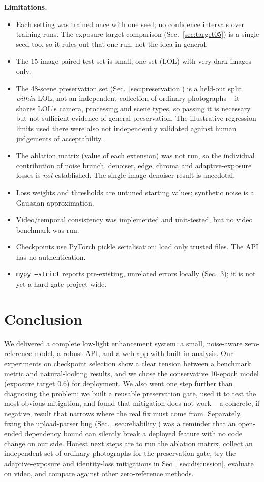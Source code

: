 \documentclass{article}
\newcommand{\code}[1]{\texttt{#1}}
\begin{document}
\textbf{Limitations.}
\begin{itemize}[nosep]
  \item Each setting was trained once with one seed; no confidence intervals over training runs. The exposure-target comparison (Sec.~\ref{sec:target05}) is a single seed too, so it rules out that one run, not the idea in general.
  \item The 15-image paired test set is small; one set (LOL) with very dark images only.
  \item The 48-scene preservation set (Sec.~\ref{sec:preservation}) is a held-out split \emph{within} LOL, not an independent collection of ordinary photographs -- it shares LOL's camera, processing and scene types, so passing it is necessary but not sufficient evidence of general preservation. The illustrative regression limits used there were also not independently validated against human judgements of acceptability.
  \item The ablation matrix (value of each extension) was not run, so the individual contribution of noise branch, denoiser, edge, chroma and adaptive-exposure losses is \emph{not} established. The single-image denoiser result is anecdotal.
  \item Loss weights and thresholds are untuned starting values; synthetic noise is a Gaussian approximation.
  \item Video/temporal consistency was implemented and unit-tested, but no video benchmark was run.
  \item Checkpoints use PyTorch pickle serialisation: load only trusted files. The API has no authentication.
  \item \code{mypy --strict} reports pre-existing, unrelated errors locally (Sec.~3); it is not yet a hard gate project-wide.
\end{itemize}

\section{Conclusion}
We delivered a complete low-light enhancement system: a small, noise-aware zero-reference model, a robust API, and a web app with built-in analysis. Our experiments on checkpoint selection show a clear tension between a benchmark metric and natural-looking results, and we chose the conservative 10-epoch model (exposure target 0.6) for deployment. We also went one step further than diagnosing the problem: we built a reusable preservation gate, used it to test the most obvious mitigation, and found that mitigation does not work -- a concrete, if negative, result that narrows where the real fix must come from. Separately, fixing the upload-parser bug (Sec.~\ref{sec:reliability}) was a reminder that an open-ended dependency bound can silently break a deployed feature with no code change on our side. Honest next steps are to run the ablation matrix, collect an independent set of ordinary photographs for the preservation gate, try the adaptive-exposure and identity-loss mitigations in Sec.~\ref{sec:discussion}, evaluate on video, and compare against other zero-reference methods.
\end{document}
